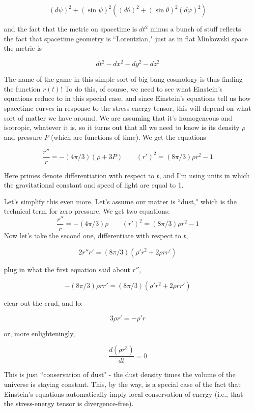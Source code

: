 \[(d\psi)^2 + (\sin\psi )^2((d\theta)^2 + (\sin\theta)^2 (d\varphi)^2)\]

and the fact that the metric on spacetime is $dt^2$ minus a bunch of stuff reflects the fact that spacetime geometry is ``Lorentzian," just as in flat Minkowski space the metric is

\[dt^2 - dx^2 - dy^2 - dz^2\]

The name of the game in this simple sort of big bang cosmology is thus finding the function $r(t)$! To do this, of course, we need to see what Einstein's equations reduce to in this special case, and since Einstein's equations tell us how spacetime curves in response to the stress-energy tensor, this will depend on what sort of matter we have around. We are assuming that it's homogeneous and isotropic, whatever it is, so it turns out that all we need to know is its density $\rho$ and pressure $P$ (which are functions of time). We get the equations

$$\frac{r''}{r} = -(4\pi/3)(\rho + 3P) \quad \quad (r')^2 = (8\pi/3) \rho r^2 - 1$$

Here primes denote differentiation with respect to $t$, and I'm using units in which the gravitational constant and speed of light are equal to 1.

Let's simplify this even more. Let's assume our matter is ``dust," which is the technical term for zero pressure. We get two equations:
\begin{equation}\label{eq:1}
    \frac{r''}{r} = -(4\pi/3)\rho \quad \quad (r')^2 = (8\pi/3) \rho r^2 -1 
\end{equation}
Now let's take the second one, differentiate with respect to $t$,

\[2r''r' = (8\pi/3)(\rho'r^2 + 2\rho rr')\]

plug in what the first equation said about $r''$,

\[-(8\pi/3) \rho r r' = (8\pi/3)(\rho' r^2 + 2\rho r r')\]

clear out the crud, and lo:

\[3\rho r' = -\rho' r\]

or, more enlighteningly,

\[\frac{d(\rho r^3)}{dt} = 0\]

This is just ``conservation of dust" - the dust density times the volume of the universe is staying constant. This, by the way, is a special case of the fact that Einstein's equations automatically imply local conservation of energy (i.e., that the stress-energy tensor is divergence-free).

